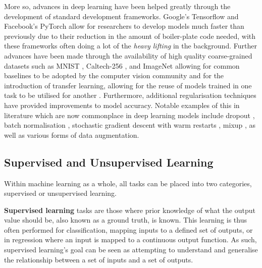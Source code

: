 More so, advances in deep learning have been helped greatly through the development of standard development frameworks. Google's Tensorflow \cite{abadi_tensorflow:_2016} and Facebook's PyTorch \cite{paszke_automatic_2017} allow for researchers to develop models much faster than previously due to their reduction in the amount of boiler-plate code needed, with these frameworks often doing a lot of the \textit{heavy lifting} in the background. Further advances have been made through the availability of high quality coarse-grained datasets such as MNIST \cite{lecun_gradient-based_1998}, Caltech-256 \cite{griffin_caltech-256_2007}, and ImageNet \cite{deng_imagenet:_2009} allowing for common baselines to be adopted by the computer vision community and for the introduction of transfer learning, allowing for the reuse of models trained in one task to be utilised for another \cite{pan_survey_2010}. Furthermore, additional regularisation techniques have provided improvements to model accuracy. Notable examples of this in literature which are now commonplace in deep learning models include dropout \cite{srivastava_dropout:_2014}, batch normalisation \cite{ioffe_batch_2015}, stochastic gradient descent with warm restarts \cite{loshchilov_sgdr:_2016}, mixup \cite{zhang_mixup:_2017}, as well as various forms of data augmentation. 

\subsection{Supervised and Unsupervised Learning}\label{ch:Background,sec:DLIntro,sub:supervisedVsUnsupervisedLearning}
Within machine learning as a whole, all tasks can be placed into two categories, supervised or unsupervised learning. 

\textbf{Supervised learning} tasks are those where prior knowledge of what the output value should be, also known as a ground truth, is known. This learning is thus often performed for classification, mapping inputs to a defined set of outputs, or in regression where an input is mapped to a continuous output function. As such, supervised learning's goal can be seen as attempting to understand and generalise the relationship between a set of inputs and a set of outputs. 

